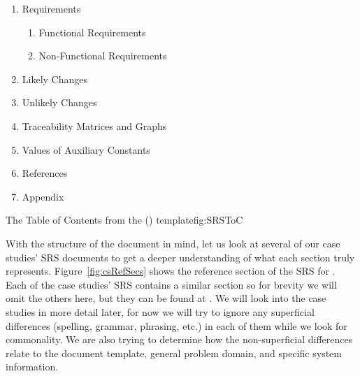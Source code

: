 {\begin{center}
\begin{enumerate}[nosep, label*=\arabic*.]
\begin{enumerate}[nosep, label*=\arabic*.]
\begin{enumerate}[nosep, label*=\arabic*.]
    \item Data Definitions
    \item Instance Models
    \item Data Constraints
    \item Properties of a Correct Solution
\end{enumerate}
\end{enumerate}
\item Requirements
\begin{enumerate}[nosep, label*=\arabic*.]
  \item Functional Requirements
  \item Non-Functional Requirements         
\end{enumerate}
\item Likely Changes
\item Unlikely Changes
\item Traceability Matrices and Graphs
\item Values of Auxiliary Constants
\item References
\item Appendix
\end{enumerate}
  \end{center}
}{The Table of Contents from the () \smithea{} 
template}{fig:SRSToC}

With the structure of the document in mind, let us look at several of our case
studies' SRS documents to get a deeper understanding of what each section truly
represents. Figure~\ref{fig:csRefSecs} shows the reference section of the SRS 
for \gb. Each of the case studies' SRS contains a similar section so for 
brevity we will omit the others here, but they can be found at . 
We will look into the case studies in more detail later, for now we will try to 
ignore any superficial differences (spelling, grammar, phrasing, etc.) in each 
of them while we look for commonality. We are also trying to determine how the 
non-superficial differences relate to the document template, general problem 
domain, and specific system information.


